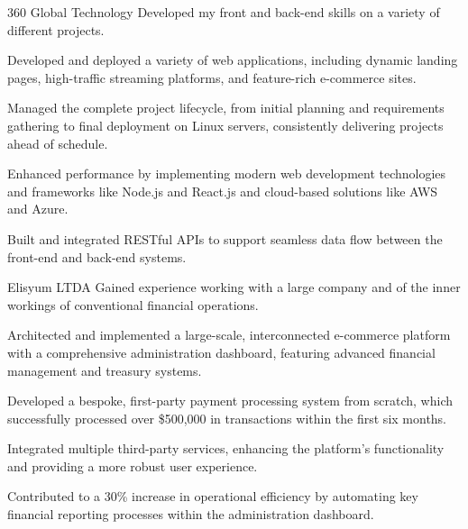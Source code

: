 \begin{experience}{360 Global Technology}{
}
Developed my front and back-end skills on a variety of different projects.\\
\begin{contribs}
	\item{Developed and deployed a variety of web applications, including dynamic landing pages, high-traffic streaming platforms, and feature-rich e-commerce sites.}
	\item{Managed the complete project lifecycle, from initial planning and requirements gathering to final deployment on Linux servers, consistently delivering projects ahead of schedule.}
	\item{Enhanced performance by implementing modern web development technologies and frameworks like Node.js and React.js and cloud-based solutions like AWS and Azure.}
	\item{Built and integrated RESTful APIs to support seamless data flow between the front-end and back-end systems.}
\end{contribs}

\end{experience}

\begin{experience}[last]{Elisyum LTDA}{
}
Gained experience working with a large company and of the inner workings of conventional financial operations.\\
\begin{contribs}
	\item{Architected and implemented a large-scale, interconnected e-commerce platform with a comprehensive administration dashboard, featuring advanced financial management and treasury systems.}
	\item{Developed a bespoke, first-party payment processing system from scratch, which successfully processed over \$500,000 in transactions within the first six months.}
	\item{Integrated multiple third-party services, enhancing the platform's functionality and providing a more robust user experience.}
	\item{Contributed to a 30\% increase in operational efficiency by automating key financial reporting processes within the administration dashboard.}
\end{contribs}

\end{experience}
